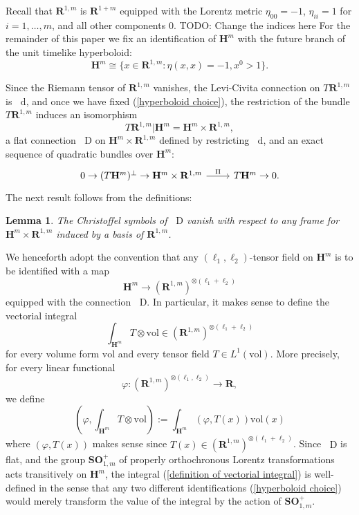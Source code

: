 \documentclass[reqno,12pt,letterpaper]{amsart}
\newcommand{\RR}{\mathbf{R}}
\newcommand{\Hyp}{\mathbf H}
\newcommand{\SpOrth}{\mathbf{SO}}
\newcommand*\dif{\mathop{}\!\mathrm{d}}
\newcommand*\Dif{\mathop{}\!\mathrm{D}}
\newcommand{\vol}{\mathrm{vol}}
\newtheorem{lemma}[theorem]{Lemma}
\theoremstyle{definition}
\numberwithin{equation}{section}
\begin{document}
Recall that $\RR^{1,m}$ is $\RR^{1 + m}$ equipped with the Lorentz metric $\eta_{00} = -1$, $\eta_{ii} = 1$ for $i = 1, \dots, m$, and all other components $0$. TODO: Change the indices here
For the remainder of this paper we fix an identification of $\Hyp^m$ with the future branch of the unit timelike hyperboloid:
\begin{equation}\label{hyperboloid choice}
\Hyp^m \cong \{x \in \RR^{1,m}: \eta(x, x) = -1, x^0 > 1\}.
\end{equation}

Since the Riemann tensor of $\RR^{1,m}$ vanishes, the Levi-Civita connection on $T\RR^{1, m}$ is $\dif$, and once we have fixed (\ref{hyperboloid choice}), the restriction of the bundle $T\RR^{1, m}$ induces an isomorphism
$$T\RR^{1,m}|\Hyp^m = \Hyp^m \times \RR^{1,m},$$
a flat connection $\Dif$ on $\Hyp^m \times \RR^{1, m}$ defined by restricting $\dif$, and an exact sequence of quadratic bundles over $\Hyp^m$:
$$\begin{tikzcd}
0 \to (T\Hyp^m)^\perp \to \Hyp^m \times \RR^{1, m} \arrow[r,"\Pi"] & T\Hyp^m \to 0.
\end{tikzcd}$$
The next result follows from the definitions:

\begin{lemma}
The Christoffel symbols of $\Dif$ vanish with respect to any frame for $\Hyp^m \times \RR^{1,m}$ induced by a basis of $\RR^{1, m}$.
\end{lemma}

We henceforth adopt the convention that any $(\ell_1, \ell_2)$-tensor field on $\Hyp^m$ is to be identified with a map
$$\Hyp^m \to (\RR^{1, m})^{\otimes(\ell_1 + \ell_2)}$$
equipped with the connection $\Dif$.
In particular, it makes sense to define the vectorial integral
\begin{equation}\label{definition of vectorial integral}
\int_{\Hyp^m} T \otimes \vol \in (\RR^{1, m})^{\otimes (\ell_1 + \ell_2)}
\end{equation}
for every volume form $\vol$ and every tensor field $T \in L^1(\vol)$. More precisely, for every linear functional
$$\varphi: (\RR^{1, m})^{\otimes(\ell_1, \ell_2)} \to \RR,$$
we define
$$\left(\varphi, \int_{\Hyp^m} T \otimes \vol\right) := \int_{\Hyp^m} (\varphi, T(x)) \vol(x)$$
where $(\varphi, T(x))$ makes sense since $T(x) \in (\RR^{1, m})^{\otimes (\ell_1 + \ell_2)}$.
Since $\Dif$ is flat, and the group $\SpOrth^+_{1, m}$ of properly orthochronous Lorentz transformations acts transitively on $\Hyp^m$, the integral (\ref{definition of vectorial integral}) is well-defined in the sense that any two different identifications (\ref{hyperboloid choice}) would merely transform the value of the integral by the action of $\SpOrth^+_{1, m}$.
\end{document}
